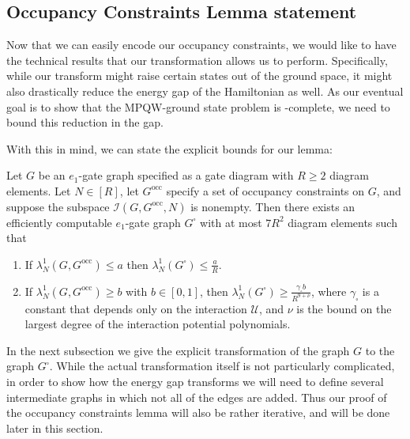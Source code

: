 \documentclass[../thesis-main/thesis-main]{subfiles}
\begin{document}
\subsection{Occupancy Constraints Lemma statement}
\label{sec:occupancy_statement}

Now that we can easily encode our occupancy constraints, we would like to have the technical results that our transformation allows us to perform.  Specifically, while our transform might raise certain states out of the ground space, it might also drastically reduce the energy gap of the Hamiltonian as well.  As our eventual goal is to show that the MPQW-ground state problem is \QMA-complete, we need to bound this reduction in the gap.  


With this in mind, we can state the explicit bounds for our lemma:
\begin{lemma}\label{lem:oc}
Let $G$ be an $e_{1}$-gate graph specified as a gate diagram with $R\geq2$ diagram elements. Let $N\in[R]$, let $G^{\text{occ}}$ specify a set of occupancy constraints on $G$, and suppose the subspace $\mathcal{I}(G,G^{\text{occ}},N)$ is nonempty. Then there exists an efficiently computable $e_{1}$-gate graph $G^{\square}$ with at most $7R^{2}$ diagram elements such that
\begin{enumerate}
\item If $\lambda_{N}^{1}(G,G^{\text{occ}})\leq a$ then $\lambda_{N}^{1}(G^{\square})\leq\frac{a}{R}$.
\item If $\lambda_{N}^{1}(G,G^{\text{occ}})\geq b$ with $b\in[0,1]$, then $\lambda_{N}^{1}(G^{\square})\geq \frac{\gamma_{\square}b}{R^{9+\nu}}$, where $\gamma_{\square}$ is a constant that depends only on the interaction $\mathcal{U}$, and $\nu$ is the bound on the largest degree of the interaction potential polynomials.
\end{enumerate}
\end{lemma}

In the next subsection we give the explicit transformation of the graph $G$ to the graph $G^{\square}$. While the actual transformation itself is not particularly complicated, in order to show how the energy gap transforms we will need to define several intermediate graphs in which not all of the edges are added.  Thus our proof of the occupancy constraints lemma will also be rather iterative, and will be done later in this section.
\end{document}
